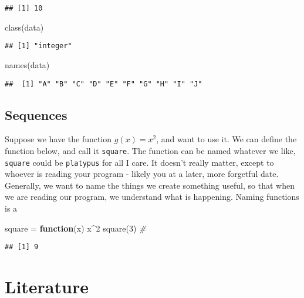 \documentclass[
]{book}
\newenvironment{Shaded}{\begin{snugshade}}{\end{snugshade}}
\newcommand{\CommentTok}[1]{\textcolor[rgb]{0.56,0.35,0.01}{\textit{#1}}}
\newcommand{\ControlFlowTok}[1]{\textcolor[rgb]{0.13,0.29,0.53}{\textbf{#1}}}
\newcommand{\DecValTok}[1]{\textcolor[rgb]{0.00,0.00,0.81}{#1}}
\newcommand{\FunctionTok}[1]{\textcolor[rgb]{0.00,0.00,0.00}{#1}}
\newcommand{\NormalTok}[1]{#1}
\newcommand{\OtherTok}[1]{\textcolor[rgb]{0.56,0.35,0.01}{#1}}
\newcommand{\SpecialCharTok}[1]{\textcolor[rgb]{0.00,0.00,0.00}{#1}}
\begin{document}
\begin{verbatim}
## [1] 10
\end{verbatim}

\begin{Shaded}
\begin{Highlighting}[]
\FunctionTok{class}\NormalTok{(data)}
\end{Highlighting}
\end{Shaded}

\begin{verbatim}
## [1] "integer"
\end{verbatim}

\begin{Shaded}
\begin{Highlighting}[]
\FunctionTok{names}\NormalTok{(data)}
\end{Highlighting}
\end{Shaded}

\begin{verbatim}
##  [1] "A" "B" "C" "D" "E" "F" "G" "H" "I" "J"
\end{verbatim}

\hypertarget{sequences}{%
\section{Sequences}\label{sequences}}

Suppose we have the function \(g(x) = x^2\), and want to use it. We can define the function below, and call it \texttt{square}. The function can be named whatever we like, \texttt{square} could be \texttt{platypus} for all I care. It doesn't really matter, except to whoever is reading your program - likely you at a later, more forgetful date. Generally, we want to name the things we create something useful, so that when we are reading our program, we understand what is happening. Naming functions is a

\begin{Shaded}
\begin{Highlighting}[]
\NormalTok{square }\OtherTok{=} \ControlFlowTok{function}\NormalTok{(x) x}\SpecialCharTok{\^{}}\DecValTok{2} 
\FunctionTok{square}\NormalTok{(}\DecValTok{3}\NormalTok{) }\CommentTok{\# }
\end{Highlighting}
\end{Shaded}

\begin{verbatim}
## [1] 9
\end{verbatim}

\hypertarget{literature}{%
\chapter{Literature}\label{literature}}
\end{document}
